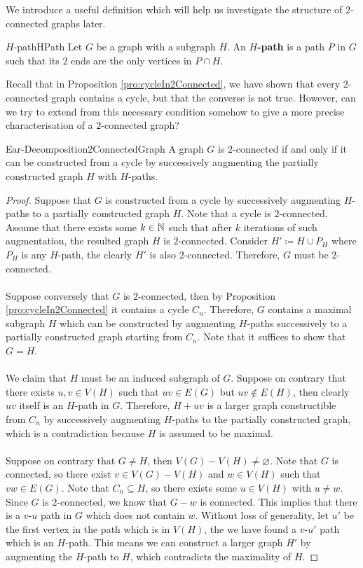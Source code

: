 \documentclass[math, code]{amznotes}
\theoremstyle{remark}
\begin{document}
We introduce a useful definition which will help us investigate the structure of $2$-connected graphs later.
\begin{dfnbox}{$H$-path}{HPath}
    Let $G$ be a graph with a subgraph $H$. An {\color{red} \textbf{$H$-path}} is a path $P$ in $G$ such that its $2$ ends are the only vertices in $P \cap H$.
\end{dfnbox}
Recall that in Proposition \ref{pro:cycleIn2Connected}, we have shown that every $2$-connected graph contains a cycle, but that the converse is not true. However, can we try to extend from this necessary condition somehow to give a more precise characterisation of a $2$-connected graph?
\begin{thmbox}{Ear-Decomposition}{2ConnectedGraph}
    A graph $G$ is $2$-connected if and only if it can be constructed from a cycle by successively augmenting the partially constructed graph $H$ with $H$-paths.
    \tcblower
    \begin{proof}
        Suppose that $G$ is constructed from a cycle by successively augmenting $H$-paths to a partially constructed graph $H$. Note that a cycle is $2$-connected. Assume that there exists some $k \in \mathbb{N}$ such that after $k$ iterations of such augmentation, the resulted graph $H$ is $2$-connected. Consider $H' \coloneqq H \cup P_H$ where $P_H$ is any $H$-path, the clearly $H'$ is also $2$-connected. Therefore, $G$ must be $2$-connected.
        \\\\
        Suppose conversely that $G$ is $2$-connected, then by Proposition \ref{pro:cycleIn2Connected} it contains a cycle $C_n$. Therefore, $G$ contains a maximal subgraph $H$ which can be constructed by augmenting $H$-paths successively to a partially constructed graph starting from $C_n$. Note that it suffices to show that $G = H$.
        \\\\
        We claim that $H$ must be an induced subgraph of $G$. Suppose on contrary that there exists $u, v \in V(H)$ such that $uv \in E(G)$ but $uv \notin E(H)$, then clearly $uv$ itself is an $H$-path in $G$. Therefore, $H + uv$ is a larger graph constructible from $C_n$ by successively augmenting $H$-paths to the partially constructed graph, which is a contradiction because $H$ is assumed to be maximal.
        \\\\
        Suppose on contrary that $G \neq H$, then $V(G) - V(H) \neq \varnothing$. Note that $G$ is connected, so there exist $v \in V(G) - V(H)$ and $w \in V(H)$ such that $vw \in E(G)$. Note that $C_n \subseteq H$, so there exists some $u \in V(H)$ with $u \neq w$. Since $G$ is $2$-connected, we know that $G - w$ is connected. This implies that there is a $v$-$u$ path in $G$ which does not contain $w$. Without loss of generality, let $u'$ be the first vertex in the path which is in $V(H)$, the we have found a $v$-$u'$ path which is an $H$-path. This means we can construct a larger graph $H'$ by augmenting the $H$-path to $H$, which contradicts the maximality of $H$.
    \end{proof}
\end{thmbox}
\end{document}
